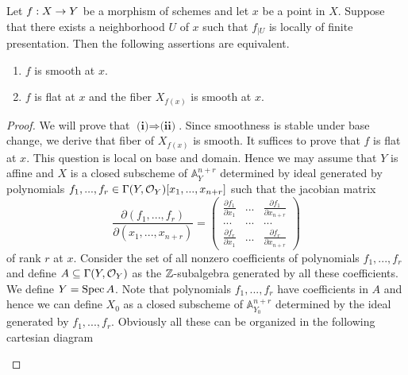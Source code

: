 \begin{theorem}
Let $f:X\rightarrow Y$ be a morphism of schemes and let $x$ be a point in $X$. Suppose that there exists a neighborhood $U$ of $x$ such that $f_{\mid U}$ is locally of finite presentation. Then the following assertions are equivalent.
\begin{enumerate}[label=\emph{\textbf{(\roman*)}}, leftmargin=3.0em]
\item $f$ is smooth at $x$.
\item $f$ is flat at $x$ and the fiber $X_{f(x)}$ is smooth at $x$.
\end{enumerate}
\end{theorem}
\begin{proof}
We will prove that $\textbf{(i)}\Rightarrow \textbf{(ii)}$. Since smoothness is stable under base change, we derive that fiber of $X_{f(x)}$ is smooth. It suffices to prove that $f$ is flat at $x$. This question is local on base and domain. Hence we may assume that $Y$ is affine and $X$ is a closed subscheme of $\mathbb{A}^{n+r}_Y$ determined by ideal generated by polynomials $f_1,...,f_r\in \Gamma(Y,{\mathcal O}_Y)[x_1,...,x_{n+r}]$ such that the jacobian matrix
$$\frac{\partial(f_1,...,f_r)}{\partial(x_1,...,x_{n+r})}= \left( \begin{array}{ccc}
\frac{\partial f_1}{\partial x_1} & ... & \frac{\partial f_1}{\partial x_{n+r}} \\
... &...  &...  \\
\frac{\partial f_r}{\partial x_{1}} &...  & \frac{\partial f_r}{\partial x_{n+r}}\end{array} \right)$$
of rank $r$ at $x$. Consider the set of all nonzero coefficients of polynomials $f_1,...,f_r$ and define $A \subseteq \Gamma(Y,{\mathcal O}_Y)$ as the ${\mathbb Z}$-subalgebra generated by all these coefficients. We define $Y = \mathrm{Spec}\, A$. Note that polynomials $f_1,...,f_r$ have coefficients in $A$ and hence we can define $X_0$ as a closed subscheme of $\mathbb{A}^{n+r}_{Y_0}$ determined by the ideal generated by $f_1,...,f_r$. Obviously all these can be organized in the following cartesian diagram
\begin{center}
\end{center}
\end{proof}
